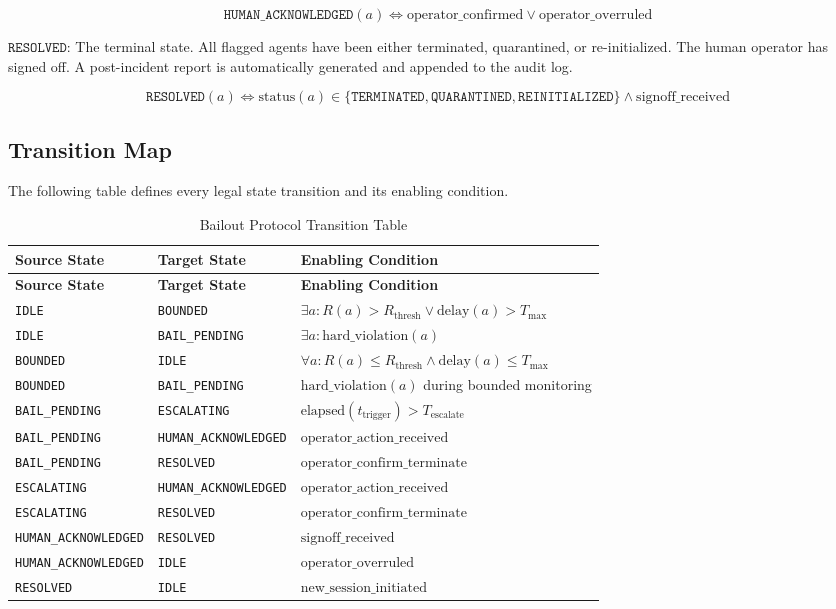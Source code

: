 \[
\texttt{HUMAN\_ACKNOWLEDGED}(a) \iff \text{operator\_confirmed} \lor \text{operator\_overruled}
\]

\bigskip
\noindent$\texttt{RESOLVED:}$ The terminal state. All flagged agents have been either terminated, quarantined, or re-initialized. The human operator has signed off. A post-incident report is automatically generated and appended to the audit log.

\[
\texttt{RESOLVED}(a) \iff \text{status}(a) \in \{ \texttt{TERMINATED}, \texttt{QUARANTINED}, \texttt{REINITIALIZED} \} \land \text{signoff\_received}
\]

\subsection{Transition Map}

The following table defines every legal state transition and its enabling condition.

\begin{longtable}{|l|l|l|}
\caption{Bailout Protocol Transition Table} \\
\hline
\textbf{Source State} & \textbf{Target State} & \textbf{Enabling Condition} \\
\hline
\endfirsthead
\hline
\textbf{Source State} & \textbf{Target State} & \textbf{Enabling Condition} \\
\hline
\endhead
\texttt{IDLE} & \texttt{BOUNDED} & $\exists a: R(a) > R_{\text{thresh}} \lor \text{delay}(a) > T_{\max}$ \\
\texttt{IDLE} & \texttt{BAIL\_PENDING} & $\exists a: \text{hard\_violation}(a)$ \\
\texttt{BOUNDED} & \texttt{IDLE} & $\forall a: R(a) \leq R_{\text{thresh}} \land \text{delay}(a) \leq T_{\max}$ \\
\texttt{BOUNDED} & \texttt{BAIL\_PENDING} & $\text{hard\_violation}(a)$ during bounded monitoring \\
\texttt{BAIL\_PENDING} & \texttt{ESCALATING} & $\text{elapsed}(t_{\text{trigger}}) > T_{\text{escalate}}$ \\
\texttt{BAIL\_PENDING} & \texttt{HUMAN\_ACKNOWLEDGED} & $\text{operator\_action\_received}$ \\
\texttt{BAIL\_PENDING} & \texttt{RESOLVED} & $\text{operator\_confirm\_terminate}$ \\
\texttt{ESCALATING} & \texttt{HUMAN\_ACKNOWLEDGED} & $\text{operator\_action\_received}$ \\
\texttt{ESCALATING} & \texttt{RESOLVED} & $\text{operator\_confirm\_terminate}$ \\
\texttt{HUMAN\_ACKNOWLEDGED} & \texttt{RESOLVED} & $\text{signoff\_received}$ \\
\texttt{HUMAN\_ACKNOWLEDGED} & \texttt{IDLE} & $\text{operator\_overruled}$ \\
\texttt{RESOLVED} & \texttt{IDLE} & $\text{new\_session\_initiated}$ \\
\hline
\end{longtable}

